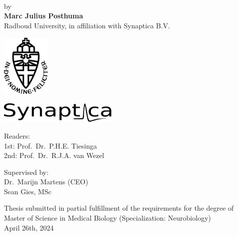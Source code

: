 \documentclass[12pt]{report}
\begin{document}
\begin{titlepage}
    \centering
    \vspace*{1cm}
    \\
    \\
    \\[1cm]
    \Large by\\[1cm]
    \Large \textbf{Marc Julius Posthuma}\\[1cm]
    \Large Radboud University, in affiliation with Synaptica B.V.\\[2cm]

    \noindent
    \begin{minipage}[c]{0.5\textwidth}
        \centering
        \includegraphics[height=3cm,keepaspectratio]{Radboud_Universiteit_Nijmegen-logo.png}
    \end{minipage}%
    \begin{minipage}[c]{0.5\textwidth}
        \centering
        \includegraphics[height=1cm,keepaspectratio]{synaptica_logo.png}
    \end{minipage}

    \vspace{1cm} %

    \noindent
    \begin{minipage}[t]{0.5\textwidth}
        \centering
        \Large Readers:\\
        1st: Prof.\ Dr.\ P.H.E. Tiesinga\\
        2nd: Prof.\ Dr.\ R.J.A. van Wezel
    \end{minipage}%
    \begin{minipage}[t]{0.5\textwidth}
        \centering
        \Large Supervised by:\\
        Dr.\ Marijn Martens (CEO)\\
        Sean Gies, MSc
    \end{minipage}

    \vfill

    \footnotesize Thesis submitted in partial fulfillment of the requirements
    for the degree of Master of Science in Medical Biology (Specialization: Neurobiology)\\[1cm]
    \Large April 26th, 2024
\end{titlepage}
\end{document}
